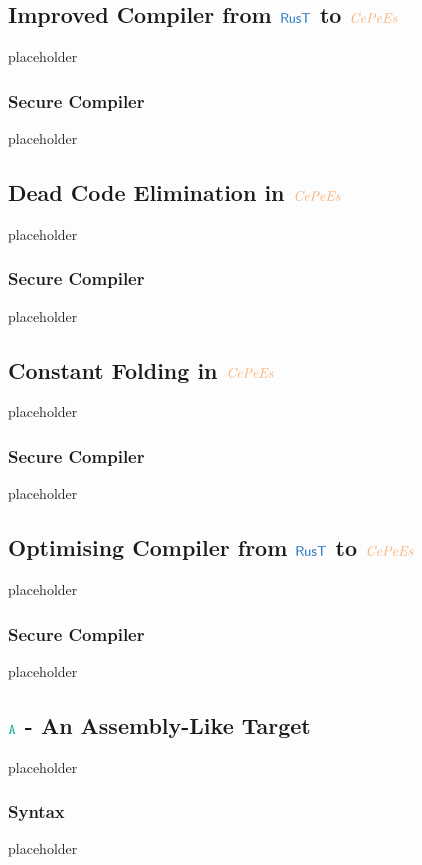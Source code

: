 \documentclass[a4paper,12pt]{article}
\begin{document}
\subsection{Improved Compiler from $\src{RusT}$ to $\irl{CePeEs}$}\label{subsec-improved-rust-to-cepees}
placeholder
\subsubsection{Secure Compiler}\label{subsec-improved-rust-to-cepees-seccomp}
placeholder

\subsection{Dead Code Elimination in $\irl{CePeEs}$}\label{subsec-dce-in-cepees}
placeholder
\subsubsection{Secure Compiler}\label{subsec-dce-cepees-seccomp}
placeholder

\subsection{Constant Folding in $\irl{CePeEs}$}\label{subsec-cf-in-cepees}
placeholder
\subsubsection{Secure Compiler}\label{subsec-cf-cepees-seccomp}
placeholder

\subsection{Optimising Compiler from $\src{RusT}$ to $\irl{CePeEs}$}\label{subsec-optimising-rust-to-cepees}
placeholder
\subsubsection{Secure Compiler}\label{subsec-optimising-rust-to-cepees-seccomp}
placeholder


\subsection{$\obj{A}$ - An Assembly-Like Target}\label{subsec-a}
placeholder
\subsubsection{Syntax}\label{subsec-a-syntax}
placeholder
\end{document}

